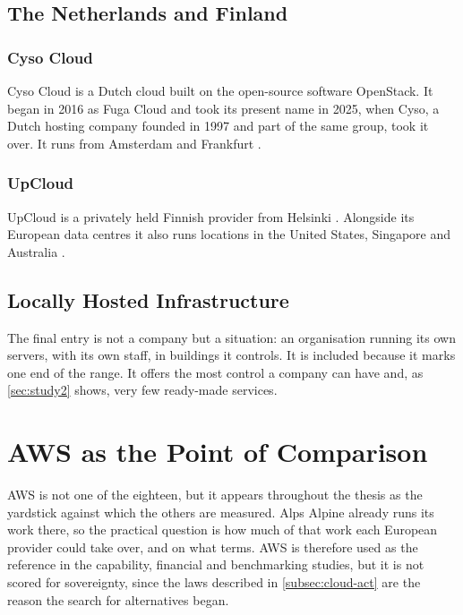 \subsection{The Netherlands and Finland}

\subsubsection*{Cyso Cloud}
Cyso Cloud is a Dutch cloud built on the open-source software OpenStack. It began
in 2016 as Fuga Cloud and took its present name in 2025, when Cyso, a Dutch hosting
company founded in 1997 and part of the same group, took it over. It runs from
Amsterdam and Frankfurt \cite{Cyso_FugaComesOfAge,FugaCloud_About}.

\subsubsection*{UpCloud}
UpCloud is a privately held Finnish provider from Helsinki \cite{UpCloud_About}.
Alongside its European data centres it also runs locations in the United States,
Singapore and Australia \cite{UpCloud_DataCenters}.

\subsection{Locally Hosted Infrastructure}

The final entry is not a company but a situation: an organisation running its own
servers, with its own staff, in buildings it controls. It is included because it
marks one end of the range. It offers the most control a company can have and, as
\cref{sec:study2} shows, very few ready-made services.

\section{AWS as the Point of Comparison}
\label{sec:aws-reference}

\acs{AWS} is not one of the eighteen, but it appears throughout the thesis as the
yardstick against which the others are measured. Alps Alpine already runs its
work there, so the practical question is how much of that work each European
provider could take over, and on what terms. \acs{AWS} is therefore used as the
reference in the capability, financial and benchmarking studies, but it is not
scored for sovereignty, since the laws described in \cref{subsec:cloud-act} are
the reason the search for alternatives began.
